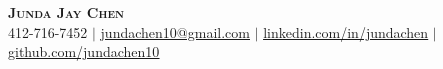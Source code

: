 
\begin{center}
    \textbf{\Huge \scshape Junda Jay Chen} \\ \vspace{1pt}
    \small 412-716-7452 $|$ \href{mailto:x@x.com}{\underline{jundachen10@gmail.com}} $|$ 
    \href{https://linkedin.com/in/jundachen}{\underline{linkedin.com/in/jundachen}} $|$
    \href{https://github.com/jundachen10}{\underline{github.com/jundachen10}}
\end{center}